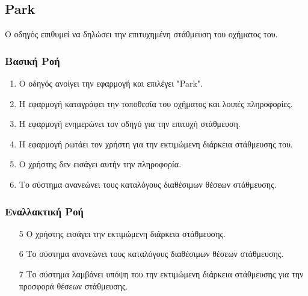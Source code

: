 \subsection{Park}

Ο οδηγός επιθυμεί να δηλώσει την επιτυχημένη στάθμευση του οχήματος του.

\subsubsection{Βασική Ροή}

\begin{enumerate}
    \item O οδηγός ανοίγει την εφαρμογή και επιλέγει "Park".
    \item Η εφαρμογή καταγράφει την τοποθεσία του οχήματος και λοιπές πληροφορίες.
    \item Η εφαρμογή ενημερώνει τον οδηγό για την επιτυχή στάθμευση.
    \item Η εφαρμογή ρωτάει τον χρήστη για την εκτιμώμενη διάρκεια στάθμευσης του.
    \item Ο χρήστης δεν εισάγει αυτήν την πληροφορία.
    \item Το σύστημα ανανεώνει τους καταλόγους διαθέσιμων θέσεων στάθμευσης.
\end{enumerate}

\subsubsection{Εναλλακτική Ροή}

\begin{enumerate}
    \item[5] Ο χρήστης εισάγει την εκτιμώμενη διάρκεια στάθμευσης.
    \item[6] Το σύστημα ανανεώνει τους καταλόγους διαθέσιμων θέσεων στάθμευσης.
    \item[7] Το σύστημα λαμβάνει υπόψη του την εκτιμώμενη διάρκεια στάθμευσης
        για την προσφορά θέσεων στάθμευσης.
\end{enumerate}
